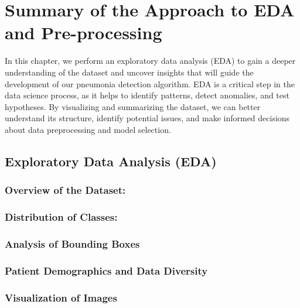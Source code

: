 \chapter{Summary of the Approach to EDA and Pre-processing}
\label{cha:chapter 2}

In this chapter, we perform an exploratory data analysis (EDA) to gain a deeper understanding of the dataset and uncover insights that will guide the development of our pneumonia detection algorithm. EDA is a critical step in the data science process, as it helps to identify patterns, detect anomalies, and test hypotheses. By visualizing and summarizing the dataset, we can better understand its structure, identify potential issues, and make informed decisions about data preprocessing and model selection.

\section{Exploratory Data Analysis (EDA)}
\label{sec:chap2 section 1}

\subsection{Overview of the Dataset:}
\label{subsec:chap2 section 1.1}

\subsection{Distribution of Classes:}
\label{subsec:chap2 section 1.2}

\subsection{Analysis of Bounding Boxes}
\label{subsec:chap2 section 1.3}

\subsection{Patient Demographics and Data Diversity}
\label{subsec:chap2 section 1.4}

\subsection{Visualization of Images}
\label{subsec:chap2 section 1.5}

